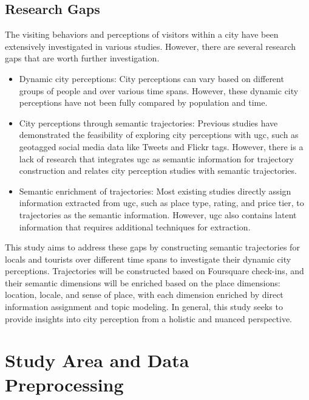 \documentclass{article}
\theoremstyle{remark}
\begin{document}
\subsection{Research Gaps}
The visiting behaviors and perceptions of visitors within a city have been extensively investigated in various studies. However, there are several research gaps that are worth further investigation.

\begin{itemize}
    \item Dynamic city perceptions: City perceptions can vary based on different groups of people and over various time spans. However, these dynamic city perceptions have not been fully compared by population and time.
    \item City perceptions through semantic trajectories: Previous studies have demonstrated the feasibility of exploring city perceptions with \acrshort{ugc}, such as geotagged social media data like Tweets and Flickr tags. However, there is a lack of research that integrates \acrshort{ugc} as semantic information for trajectory construction and relates city perception studies with semantic trajectories.
    \item Semantic enrichment of trajectories: Most existing studies directly assign information extracted from \acrshort{ugc}, such as place type, rating, and price tier, to trajectories as the semantic information. However, \acrshort{ugc} also contains latent information that requires additional techniques for extraction. 
\end{itemize}

This study aims to address these gaps by constructing semantic trajectories for locals and tourists over different time spans to investigate their dynamic city perceptions. Trajectories will be constructed based on Foursquare check-ins, and their semantic dimensions will be enriched based on the place dimensions: location, locale, and sense of place, with each dimension enriched by direct information assignment and topic modeling. In general, this study seeks to provide insights into city perception from a holistic and nuanced perspective.

\clearpage

\section{Study Area and Data Preprocessing}
\end{document}
